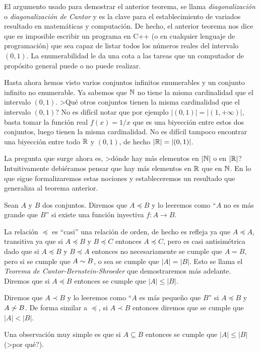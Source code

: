 El argumento usado para demostrar el anterior teorema, se llama \emph{diagonalización} o \emph{diagonalización de Cantor} y es la clave para el establecimiento de variados resultado en matemáticas y computación.
De hecho, el anterior teorema nos dice que es imposible escribir un programa en C++ (o en cualquier lenguaje de programación) que sea capaz de listar todos los números reales del intervalo $(0,1)$.
La enumerabilidad le da una cota a las tareas que un computador de propósito general puede o no puede realizar.

Hasta ahora hemos visto varios conjuntos infinitos enumerables y un conjunto infinito no enumerable.
Ya sabemos que $\mathbb{N}$ no tiene la misma cardinalidad que el intervalo $(0,1)$.
>Qué otros conjuntos tienen la misma cardinalidad que el intervalo $(0,1)$?
No es difícil notar que por ejemplo $|(0,1)|=|(1,+\infty)|$, basta tomar la función real $f(x)=1/x$ que es una biyección entre estos dos conjuntos, luego tienen la misma cardinalidad.
No es difícil tampoco encontrar una biyección entre todo $\mathbb{R}$ y $(0,1)$, de hecho $|\mathbb{R}|=|(0,1)|$.

La pregunta que surge ahora es, >dónde hay más elementos en $|\mathbb{N}|$ o en $|\mathbb{R}|$?
Intuitivamente debiéramos pensar que hay más elementos en $\mathbb{R}$ que en $\mathbb{N}$.
En lo que sigue formalizaremos estas nociones y estableceremos un resultado que generaliza al teorema anterior.

\begin{definicion}
Sean $A$ y $B$ dos conjuntos.
Diremos que $A\preceq B$ y lo leeremos como ``$A$ no es más grande que $B$'' si existe una función inyectiva $f:A\rightarrow B$.
\end{definicion}

La relación $\preceq$ es ``casi'' una relación de orden, de hecho es refleja ya que $A\preceq A$, transitiva ya que si $A\preceq B$ y $B\preceq C$ entonces $A\preceq C$, pero es casi antisimétrica dado que si $A\preceq B$ y $B\preceq A$ entonces no necesariamente se cumple que $A=B$, pero si se cumple que $A\sim B$, o sea se cumple que $|A|=|B|$.
Esto se llama el \emph{Teorema de Cantor-Bernstein-Shroeder} que demostraremos más adelante. 
Diremos que si $A\preceq B$ entonces se cumple que $|A|\leq |B|$.

Diremos que $A\prec B$ y lo leeremos como ``$A$ es más pequeño que $B$'' si $A\preceq B$ y $A\not\sim B$.
De forma similar a $\preceq$, si $A\prec B$ entonces diremos que se cumple que $|A|<|B|$.



Una observación muy simple es que si $A\subseteq B$ entonces se cumple que $|A|\leq |B|$ (>por qué?).

